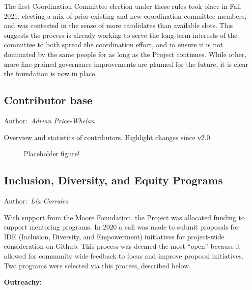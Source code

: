 \documentclass[modern]{aastex631}
\newcommand{\secauthor}[1]{{\color{blue}Author:~\textit{#1}}}
\begin{document}
The first Coordination Committee election under these rules took place in Fall
2021, electing a mix of prior existing and new coordination committee members,
and was contested in the sense of more candidates than available slots. This
suggests the process is already working to serve the long-term interests of the
committee to both spread the coordination effort, and to ensure it is not
dominated by the same people for as long as the Project continues. While other,
more fine-grained governance improvements are planned for the future, it is
clear the foundation is now in place.


\subsection{Contributor base} \label{sec:project-contributors}

\secauthor{Adrian Price-Whelan}

Overview and statistics of contributors. Highlight changes since v2.0.

\begin{figure}
    \begin{centering}
        \caption{Placeholder figure!}
        \label{fig:contributor-summary}
    \end{centering}
\end{figure}


\subsection{Inclusion, Diversity, and Equity Programs} \label{sec:project-ide}

\secauthor{Lía Corrales}

With support from the Moore Foundation, the \astropy Project was
allocated funding to support mentoring programs. In 2020 a call was
made to submit proposals for IDE (Inclusion, Diversity, and
Empowerment) initiatives for project-wide consideration on
Github. This process was deemed the most ``open'' because it allowed
for community wide feedback to focus and improve proposal
initiatives. Two programs were selected via this process, described
below.

\textbf{Outreachy:} 
\end{document}
